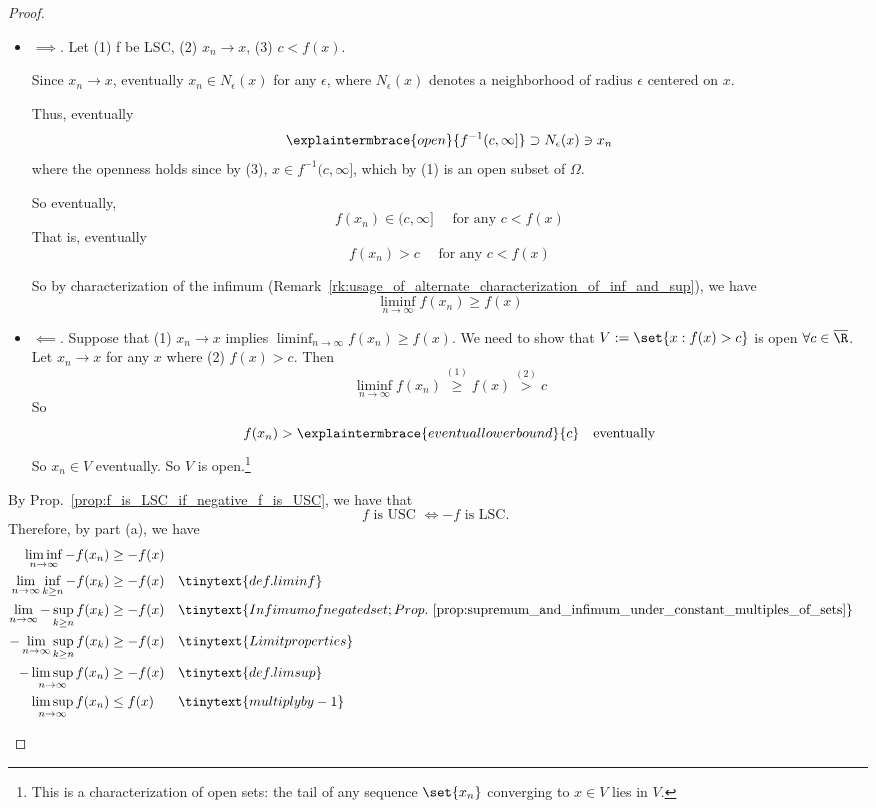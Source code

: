 \documentclass{article} %
\begin{document}
\begin{proof}
\begin{alphabate}
\item 
\begin{itemize}
\item $\boxed{\implies}$. Let (1) f be LSC, (2) $x_n \to x$, (3) $c<f(x)$.
 
Since $x_n \to x$, eventually $x_n \in N_\epsilon(x)$ for any $\epsilon$, where $N_\epsilon(x)$ denotes a neighborhood of radius $\epsilon$ centered on $x$.

Thus, eventually
\[ \explaintermbrace{open}{f^{-1}(c,\infty]} \supset N_\epsilon(x) \ni x_n\]
where the openness holds since by (3), $x \in f^{-1}(c,\infty]$, which by (1) is an open subset of $\Omega$. 


So eventually, 
\[f(x_n) \in (c,\infty] \quad \text{ for any } c<f(x)\]
That is, eventually
\[f(x_n) > c  \quad \text{ for any } c<f(x)\]

So by characterization of the infimum (Remark~\ref{rk:usage_of_alternate_characterization_of_inf_and_sup}), we have
\[ \liminf_{n \to \infty} f(x_n) \geq f(x) \]

 	
\item $\boxed{\impliedby}$.	 Suppose that (1) $x_n \to x$ implies $\liminf_{n \to \infty} f(x_n) \geq f(x)$.  We need to show that $V:=\set{x: f(x) >c}$ is open $\forall c \in \overline{\R}$.  Let $x_n \to x$ for any $x$ where (2) $f(x)>c$.  Then
\[ \liminf_{n \to \infty} f(x_n) \stackrel{(1)}{\geq} f(x) \stackrel{(2)}{>} c\]
So 
\[ f(x_n) > \explaintermbrace{eventual lower bound}{c}  \quad \text{eventually} \]
 So $x_n \in V$ eventually.  So $V$ is open.\footnote{This is a characterization of open sets: the tail of any sequence $\set{x_n}$ converging to $x \in V$ lies in $V$.}      
\end{itemize}
\item By Prop.~\ref{prop:f_is_LSC_if_negative_f_is_USC}, we have that
\[ f \text{ is USC } \iff  -f \text{ is LSC. } \]
Therefore, by part (a), we have 
\begin{align*}
\liminf_{n \to \infty} -f(x_n) &\geq -f(x) \\
\lim_{n \to \infty} \inf_{k \geq n} -f(x_k) &\geq -f(x) && \tinytext{def. liminf} \\
\lim_{n \to \infty} - \sup_{k \geq n} f(x_k) &\geq -f(x) && \tinytext{Infimum of negated set; Prop.~\ref{prop:supremum_and_infimum_under_constant_multiples_of_sets}} \\
- \lim_{n \to \infty} \sup_{k \geq n} f(x_k) &\geq -f(x) && \tinytext{Limit properties} \\
- \limsup_{n \to \infty} f(x_n) &\geq -f(x) && \tinytext{def. limsup} \\
\limsup_{n \to \infty} f(x_n) &\leq f(x) && \tinytext{multiply by -1} \\
\end{align*}

\end{alphabate}

\end{proof}
\end{document}

